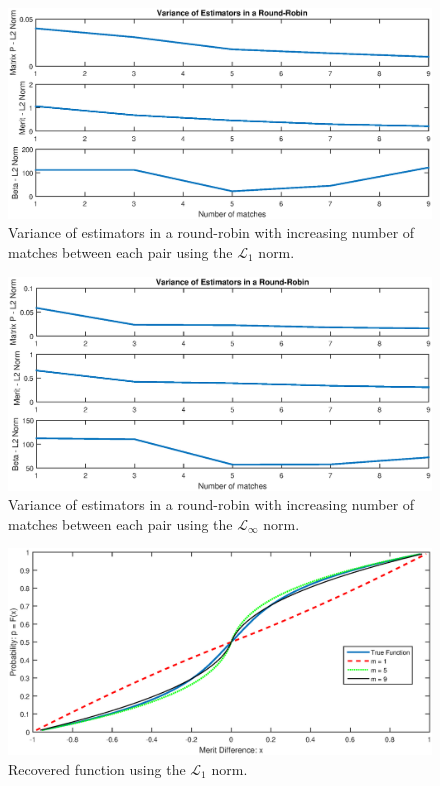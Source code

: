 \documentclass[twoside,11pt]{article}
\begin{document}
\begin{figure}
  \centering
    \includegraphics[width=1\textwidth]{L1_figure_5}
    \caption{Variance of estimators in a round-robin with increasing number of matches between each pair using the $\mathcal{L}_1$ norm. \label{L1_figure_5}}
\end{figure}

\begin{figure}
  \centering
    \includegraphics[width=1\textwidth]{Linf_figure_5}
    \caption{Variance of estimators in a round-robin with increasing number of matches between each pair using the $\mathcal{L}_{\infty}$ norm. \label{Linf_figure_5}}
\end{figure}

\begin{figure}
  \centering
    \includegraphics[width=1\textwidth]{L1_figure_6}
    \caption{Recovered function using the $\mathcal{L}_1$ norm. \label{L1_figure_6}}
\end{figure}
\end{document}
